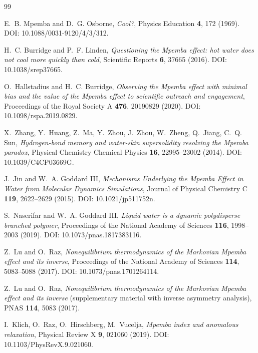 \begin{thebibliography}{99}

E.~B. Mpemba and D.~G. Osborne,
\emph{Cool?},
Physics Education \textbf{4}, 172 (1969).
DOI: 10.1088/0031-9120/4/3/312.

H.~C. Burridge and P.~F. Linden,
\emph{Questioning the Mpemba effect: hot water does not cool more quickly than cold},
Scientific Reports \textbf{6}, 37665 (2016).
DOI: 10.1038/srep37665.

O.~Hallstadius and H.~C. Burridge,
\emph{Observing the Mpemba effect with minimal bias and the value of the Mpemba effect to scientific outreach and engagement},
Proceedings of the Royal Society A \textbf{476}, 20190829 (2020).
DOI: 10.1098/rspa.2019.0829.

X.~Zhang, Y.~Huang, Z.~Ma, Y.~Zhou, J.~Zhou, W.~Zheng, Q.~Jiang, C.~Q. Sun,
\emph{Hydrogen-bond memory and water-skin supersolidity resolving the Mpemba paradox},
Physical Chemistry Chemical Physics \textbf{16}, 22995--23002 (2014).
DOI: 10.1039/C4CP03669G.

J.~Jin and W.~A. Goddard III,
\emph{Mechanisms Underlying the Mpemba Effect in Water from Molecular Dynamics Simulations},
Journal of Physical Chemistry C \textbf{119}, 2622--2629 (2015).
DOI: 10.1021/jp511752n.

S.~Naserifar and W.~A. Goddard III,
\emph{Liquid water is a dynamic polydisperse branched polymer},
Proceedings of the National Academy of Sciences \textbf{116}, 1998--2003 (2019).
DOI: 10.1073/pnas.1817383116.

Z.~Lu and O.~Raz,
\emph{Nonequilibrium thermodynamics of the Markovian Mpemba effect and its inverse},
Proceedings of the National Academy of Sciences \textbf{114}, 5083--5088 (2017).
DOI: 10.1073/pnas.1701264114.

Z.~Lu and O.~Raz,
\emph{Nonequilibrium thermodynamics of the Markovian Mpemba effect and its inverse} (supplementary material with inverse asymmetry analysis),
PNAS \textbf{114}, 5083 (2017).

I.~Klich, O.~Raz, O.~Hirschberg, M.~Vucelja,
\emph{Mpemba index and anomalous relaxation},
Physical Review X \textbf{9}, 021060 (2019).
DOI: 10.1103/PhysRevX.9.021060.


\end{thebibliography}
